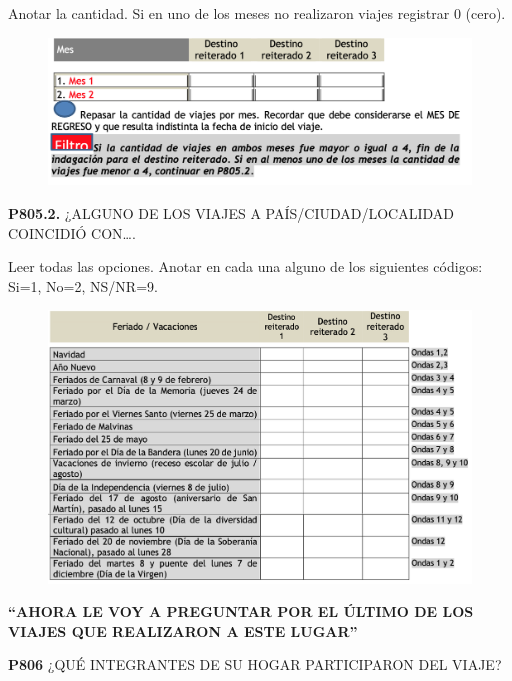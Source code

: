 \documentclass[
  openany]{book}
\begin{document}
Anotar la cantidad. Si en uno de los meses no realizaron viajes registrar 0 (cero).

\begin{figure}

{\centering \includegraphics[width=1\linewidth]{imagenes/figura6-258} 

}

\end{figure}

\textbf{P805.2.} ¿ALGUNO DE LOS VIAJES A PAÍS/CIUDAD/LOCALIDAD COINCIDIÓ CON\ldots.

Leer todas las opciones. Anotar en cada una alguno de los siguientes códigos: Si=1, No=2, NS/NR=9.

\begin{figure}

{\centering \includegraphics[width=1\linewidth]{imagenes/figura6-259} 

}

\end{figure}

\textbf{``AHORA LE VOY A PREGUNTAR POR EL ÚLTIMO DE LOS VIAJES QUE REALIZARON A ESTE LUGAR''}

\textbf{P806} ¿QUÉ INTEGRANTES DE SU HOGAR PARTICIPARON DEL VIAJE?
\end{document}
